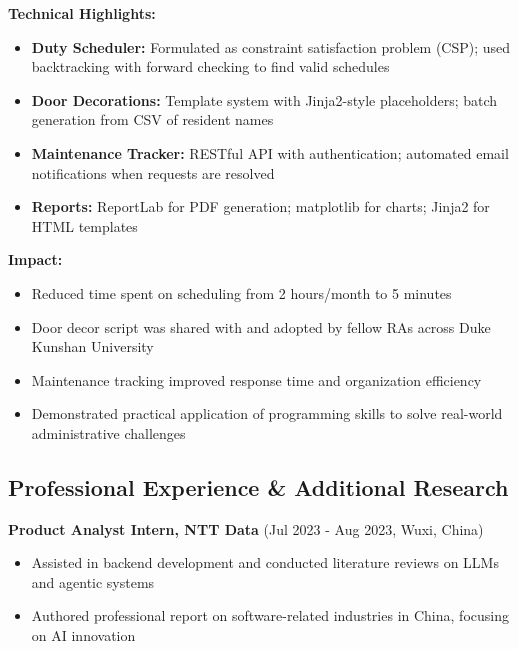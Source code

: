 \vspace{0.5em}

\textbf{Technical Highlights:}

\begin{itemize}[leftmargin=1.2em, itemsep=0.1em]
  \item \textbf{Duty Scheduler:} Formulated as constraint satisfaction problem (CSP); used backtracking with forward checking to find valid schedules
  \item \textbf{Door Decorations:} Template system with Jinja2-style placeholders; batch generation from CSV of resident names
  \item \textbf{Maintenance Tracker:} RESTful API with authentication; automated email notifications when requests are resolved
  \item \textbf{Reports:} ReportLab for PDF generation; matplotlib for charts; Jinja2 for HTML templates
\end{itemize}

\vspace{0.5em}

\textbf{Impact:}
\begin{itemize}[leftmargin=1.2em, itemsep=0.1em]
  \item Reduced time spent on scheduling from 2 hours/month to 5 minutes
  \item Door decor script was shared with and adopted by fellow RAs across Duke Kunshan University
  \item Maintenance tracking improved response time and organization efficiency
  \item Demonstrated practical application of programming skills to solve real-world administrative challenges
\end{itemize}

\vspace{2em}


\subsection*{Professional Experience \& Additional Research}

\textbf{Product Analyst Intern, NTT Data} (Jul 2023 - Aug 2023, Wuxi, China)
\begin{itemize}[leftmargin=1.2em, itemsep=0.1em]
  \item Assisted in backend development and conducted literature reviews on LLMs and agentic systems
  \item Authored professional report on software-related industries in China, focusing on AI innovation
\end{itemize}

